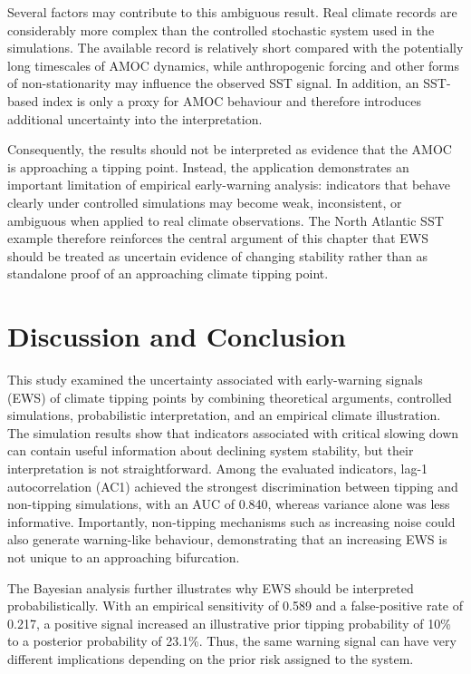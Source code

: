 \documentclass[
]{krantz}
\begin{document}
Several factors may contribute to this ambiguous result. Real climate records are considerably more complex than the controlled stochastic system used in the simulations. The available record is relatively short compared with the potentially long timescales of AMOC dynamics, while anthropogenic forcing and other forms of non-stationarity may influence the observed SST signal. In addition, an SST-based index is only a proxy for AMOC behaviour and therefore introduces additional uncertainty into the interpretation.

Consequently, the results should not be interpreted as evidence that the AMOC is approaching a tipping point. Instead, the application demonstrates an important limitation of empirical early-warning analysis: indicators that behave clearly under controlled simulations may become weak, inconsistent, or ambiguous when applied to real climate observations. The North Atlantic SST example therefore reinforces the central argument of this chapter that EWS should be treated as uncertain evidence of changing stability rather than as standalone proof of an approaching climate tipping point.

\section{Discussion and Conclusion}\label{discussion-and-conclusion}

This study examined the uncertainty associated with early-warning signals (EWS) of climate tipping points by combining theoretical arguments, controlled simulations, probabilistic interpretation, and an empirical climate illustration. The simulation results show that indicators associated with critical slowing down can contain useful information about declining system stability, but their interpretation is not straightforward. Among the evaluated indicators, lag-1 autocorrelation (AC1) achieved the strongest discrimination between tipping and non-tipping simulations, with an AUC of 0.840, whereas variance alone was less informative. Importantly, non-tipping mechanisms such as increasing noise could also generate warning-like behaviour, demonstrating that an increasing EWS is not unique to an approaching bifurcation.

The Bayesian analysis further illustrates why EWS should be interpreted probabilistically. With an empirical sensitivity of 0.589 and a false-positive rate of 0.217, a positive signal increased an illustrative prior tipping probability of 10\% to a posterior probability of 23.1\%. Thus, the same warning signal can have very different implications depending on the prior risk assigned to the system.
\end{document}
